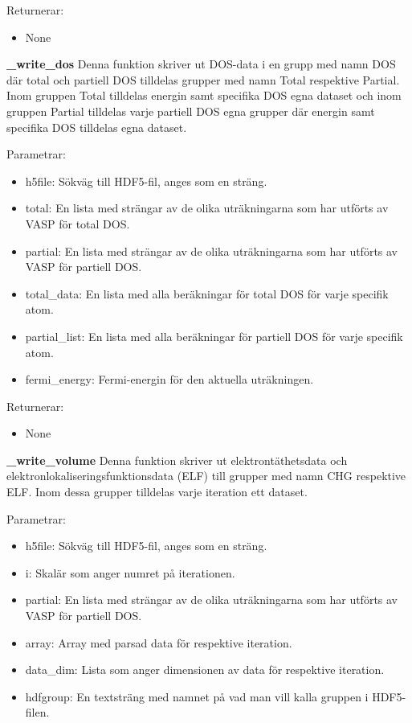 Returnerar: 
\begin{itemize}
    \item None 
\end{itemize}

\textbf{\_write\_dos}
\newline 
Denna funktion skriver ut DOS-data i en grupp med namn DOS där total och partiell DOS tilldelas grupper med namn Total respektive Partial. Inom gruppen Total tilldelas energin samt specifika DOS egna dataset och inom gruppen Partial tilldelas varje partiell DOS egna grupper där energin samt specifika DOS tilldelas egna dataset.

Parametrar:
\begin{itemize}
    \setlength\itemsep{0em}
    \item h5file: Sökväg till HDF5-fil, anges som en sträng. 
    \item total: En lista med strängar av de olika uträkningarna som har utförts av VASP för total DOS.
    \item partial: En lista med strängar av de olika uträkningarna som har utförts av VASP för partiell DOS.
    \item total\_data: En lista med alla beräkningar för total DOS för varje specifik atom.
    \item partial\_list: En lista med alla beräkningar för partiell DOS för varje specifik atom.
    \item fermi\_energy: Fermi-energin för den aktuella uträkningen.
\end{itemize}

Returnerar: 
\begin{itemize}
    \item None 
\end{itemize}

\textbf{\_write\_volume}
\newline 
Denna funktion skriver ut elektrontäthetsdata och elektronlokaliseringsfunktionsdata (ELF) till grupper med namn CHG respektive ELF. Inom dessa grupper tilldelas varje iteration ett dataset.

Parametrar:
\begin{itemize}
    \setlength\itemsep{0em}
    \item h5file: Sökväg till HDF5-fil, anges som en sträng. 
    \item i: Skalär som anger numret på iterationen.
    \item partial:  En lista med strängar av de olika uträkningarna som har utförts av VASP för partiell DOS.
    \item array: Array med parsad data för respektive iteration.
    \item data\_dim: Lista som anger dimensionen av data för respektive iteration.
    \item hdfgroup: En textsträng med namnet på vad man vill kalla gruppen i HDF5-filen.
\end{itemize}

